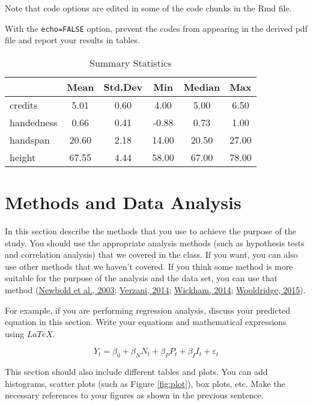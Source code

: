 \documentclass[
  12pt,
]{article}
\begin{document}
Note that code options are edited in some of the code chunks in the Rmd file.

With the \texttt{echo=FALSE} option, prevent the codes from appearing in the derived pdf file and report your results in tables.

\begin{table}[ht]
\centering
\caption{Summary Statistics} 
\label{tab:summary}
\begin{tabular}{lccccc}
  \toprule
 & Mean & Std.Dev & Min & Median & Max \\ 
  \midrule
credits & 5.01 & 0.60 & 4.00 & 5.00 & 6.50 \\ 
  handedness & 0.66 & 0.41 & -0.88 & 0.73 & 1.00 \\ 
  handspan & 20.60 & 2.18 & 14.00 & 20.50 & 27.00 \\ 
  height & 67.55 & 4.44 & 58.00 & 67.00 & 78.00 \\ 
   \bottomrule
\end{tabular}
\end{table}

\hypertarget{methods-and-data-analysis}{%
\section{Methods and Data Analysis}\label{methods-and-data-analysis}}

In this section describe the methods that you use to achieve the purpose of the study. You should use the appropriate analysis methods (such as hypothesis tests and correlation analysis) that we covered in the class. If you want, you can also use other methods that we haven't covered. If you think some method is more suitable for the purpose of the analysis and the data set, you can use that method (\protect\hyperlink{ref-newbold:2003}{Newbold et al., 2003}; \protect\hyperlink{ref-verzani:2014}{Verzani, 2014}; \protect\hyperlink{ref-wickham:2014}{Wickham, 2014}; \protect\hyperlink{ref-wooldridge:2015a}{Wooldridge, 2015}).

For example, if you are performing regression analysis, discuss your predicted equation in this section. Write your equations and mathematical expressions using \(LaTeX\).

\[
Y_t = \beta_0 + \beta_N N_t + \beta_P P_t + \beta_I I_t + \varepsilon_t
\]

This section should also include different tables and plots. You can add histograms, scatter plots (such as Figure \ref{fig:plot}), box plots, etc. Make the necessary references to your figures as shown in the previous sentence.
\end{document}
